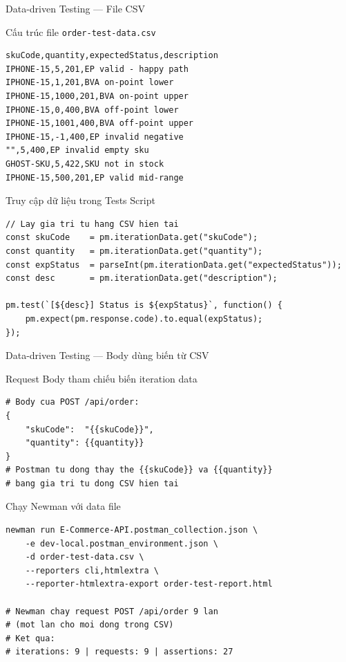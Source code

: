 \documentclass[aspectratio=169,10pt]{beamer}
\begin{document}
\begin{frame}[fragile]{Data-driven Testing --- File CSV}
  \begin{block}{Cấu trúc file \texttt{order-test-data.csv}}
\begin{lstlisting}[style=bash]
skuCode,quantity,expectedStatus,description
IPHONE-15,5,201,EP valid - happy path
IPHONE-15,1,201,BVA on-point lower
IPHONE-15,1000,201,BVA on-point upper
IPHONE-15,0,400,BVA off-point lower
IPHONE-15,1001,400,BVA off-point upper
IPHONE-15,-1,400,EP invalid negative
"",5,400,EP invalid empty sku
GHOST-SKU,5,422,SKU not in stock
IPHONE-15,500,201,EP valid mid-range
\end{lstlisting}
  \end{block}

  \begin{block}{Truy cập dữ liệu trong Tests Script}
\begin{lstlisting}[style=nonumber]
// Lay gia tri tu hang CSV hien tai
const skuCode    = pm.iterationData.get("skuCode");
const quantity   = pm.iterationData.get("quantity");
const expStatus  = parseInt(pm.iterationData.get("expectedStatus"));
const desc       = pm.iterationData.get("description");

pm.test(`[${desc}] Status is ${expStatus}`, function() {
    pm.expect(pm.response.code).to.equal(expStatus);
});
\end{lstlisting}
  \end{block}
\end{frame}

\begin{frame}[fragile]{Data-driven Testing --- Body dùng biến từ CSV}
  \begin{block}{Request Body tham chiếu biến iteration data}
\begin{lstlisting}[style=bash]
# Body cua POST /api/order:
{
    "skuCode":  "{{skuCode}}",
    "quantity": {{quantity}}
}
# Postman tu dong thay the {{skuCode}} va {{quantity}}
# bang gia tri tu dong CSV hien tai
\end{lstlisting}
  \end{block}

  \begin{block}{Chạy Newman với data file}
\begin{lstlisting}[style=bash]
newman run E-Commerce-API.postman_collection.json \
    -e dev-local.postman_environment.json \
    -d order-test-data.csv \
    --reporters cli,htmlextra \
    --reporter-htmlextra-export order-test-report.html

# Newman chay request POST /api/order 9 lan
# (mot lan cho moi dong trong CSV)
# Ket qua:
# iterations: 9 | requests: 9 | assertions: 27
\end{lstlisting}
  \end{block}
\end{frame}
\end{document}
